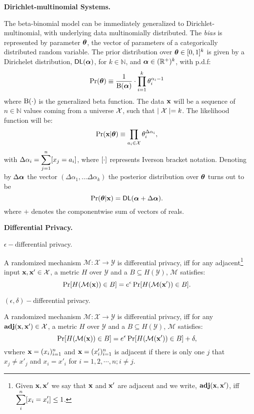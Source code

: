 \documentclass{article}
\begin{document}
\noindent \textbf{Dirichlet-multinomial Systems.}

The beta-binomial model can be immediately generalized to Dirichlet-multinomial, with underlying data multinomially distributed. The \emph{bias} is represented by parameter $\boldsymbol{\theta}$, the vector of parameters of a categorically distributed random variable. The prior distribution over $\boldsymbol{\theta}\in [0,1]^{k}$
is given by a Dirichelet distribution, $\mathsf{DL}(\boldsymbol{\alpha})$, for $k\in\mathbb{N}$,
and $\boldsymbol{\alpha}\in(\mathbb{R}^{+})^{k}$, with p.d.f:
\[
  \Pr(\boldsymbol{\theta})\equiv\frac{1}{\boldsymbol{\textup{B}}(\boldsymbol{\alpha})}\cdot \displaystyle\prod_{i=1}^{k}{\theta_i^{\alpha_i-1}}
\]
where $\boldsymbol{\textup{B}}(\cdot)$ is the generalized beta function.
The data $\textbf{x}$ will be a sequence of $n\in\mathbb{N}$ values
coming from a universe $\mathcal{X}$, such that $\mid\mathcal{X} \mid=k$.
The likelihood function will be:
\[
  \Pr(\textbf{x}|\boldsymbol{\theta})\equiv \displaystyle\prod_{a_i\in\mathcal{X}}\theta_{i}^{\Delta \alpha_i},
\]
with $\Delta \alpha_i=\displaystyle\sum_{j=1}^{n}[x_j=a_i]$, where $[\cdot]$ represents Iverson bracket notation.
Denoting by $\Delta\boldsymbol{\alpha}$ the vector $(\Delta\alpha_1,\dots \Delta\alpha_k)$ the posterior distribution over $\boldsymbol{\theta}$ turns out to be
\[
  \Pr(\boldsymbol{\theta}|\textbf{x})=\mathsf{DL}(\boldsymbol{\alpha}+\Delta \boldsymbol{\alpha}). 
\]
where $+$ denotes the componentwise sum of vectors of reals. 

\noindent \textbf{Differential Privacy.} 
\begin{definition}
\label{def_epsilon_dp}
$\epsilon-$differential privacy.

A randomized mechanism $\mathcal{M}: \mathcal{X} \rightarrow \mathcal{Y}$ is differential privacy, iff for any adjacent\footnote{Given $\textbf{x}, \textbf{x}'$  we say that $\textbf{x}$ and $\textbf{x}'$ are adjacent and we write, $\textbf{adj}(\textbf{x},\textbf{x}')$, iff\\
$\displaystyle \sum_{i}^{n}[x_i = x'_i ]\leq 1$. } input $\textbf{x}, \textbf{x}' \in \mathcal{X}$, a metric $H$ over $\mathcal{Y}$ and a $B \subseteq H(\mathcal{Y})$, $\mathcal{M}$ satisfies:
\begin{equation*}
\Pr[H(\mathcal{M}(\textbf{x})) \in B] = e^\epsilon \Pr[H(\mathcal{M}(\textbf{x}')) \in B].
\end{equation*}

\end{definition}

\begin{definition}
\label{def_epsilon_delta_dp}
$(\epsilon,\delta)-$differential privacy.

A randomized mechanism $\mathcal{M}: \mathcal{X} \rightarrow \mathcal{Y}$ is differential privacy, iff for any $\textbf{adj}(\textbf{x},\textbf{x}') \in \mathcal{X}$, a metric $H$ over $\mathcal{Y}$ and a $B \subseteq H(\mathcal{Y})$, $\mathcal{M}$ satisfies:
\begin{equation*}
\Pr[H(\mathcal{M}(\textbf{x})) \in B] = e^\epsilon \Pr[H(\mathcal{M}(\textbf{x}')) \in B] + \delta,
\end{equation*}
vwhere $\textbf{x} = (x_i)_{i = 1}^n$ and $\textbf{x} = (x'_i)_{i = 1}^n$ is adjacent if there is only one $j$ that $x_j \neq x'_j$ and $x_i = x'_i$ for $i = 1, 2, \cdots, n; i \neq j$. 
\end{definition}
\end{document}
